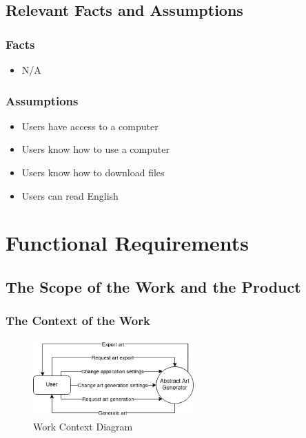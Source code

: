 \documentclass[12pt, titlepage]{article}
\begin{document}
\subsection{Relevant Facts and Assumptions}

\subsubsection{Facts}

\begin{itemize}
    \item N/A
\end{itemize}

\subsubsection{Assumptions}

\begin{itemize}
    \item Users have access to a computer
    \item Users know how to use a computer
    \item Users know how to download files
    \item Users can read English
\end{itemize}

\section{Functional Requirements}

\subsection{The Scope of the Work and the Product}

\subsubsection{The Context of the Work}

\begin{figure}[H]
    \centering
    \includegraphics[width=0.55\textwidth]{context diagram.png}
    \caption{Work Context Diagram}
    \label{fig:context}
\end{figure}
\end{document}
